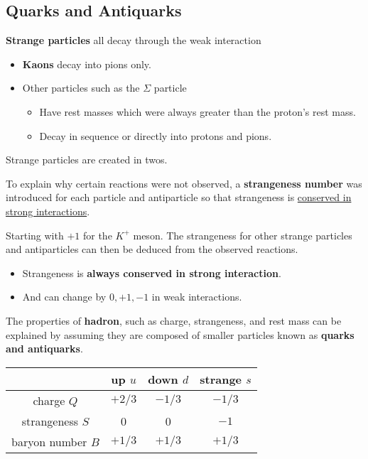 \subsection{Quarks and Antiquarks}

\textbf{Strange particles} all decay through the weak interaction
\begin{itemize}
    \item \textbf{Kaons} decay into pions only.
    \item Other particles such as the $\Sigma$ particle
        \begin{itemize}
            \item Have rest masses which were always greater than the proton's rest mass.
            \item Decay in sequence or directly into protons and pions.
        \end{itemize}
\end{itemize}
Strange particles are created in twos.

To explain why certain reactions were not observed, a \textbf{strangeness number} was introduced for each particle and antiparticle so that strangeness is \underline{conserved in strong interactions}.

Starting with $+1$ for the $K^+$ meson. The strangeness for other strange particles and antiparticles can then be deduced from the observed reactions.

\begin{itemize}
    \item Strangeness is \textbf{always conserved in strong interaction}.
    \item And can change by $0,+1,-1$ in weak interactions.
\end{itemize}

The properties of \textbf{hadron}, such as charge, strangeness, and rest mass can be explained by assuming they are composed of smaller particles known as \textbf{quarks and antiquarks}.

\begin{center}
    \begin{tabular}{|c|c|c|c|}
        \hline
        & up $u$ & down $d$ & strange $s$\\
        \hline
        charge $Q$ & $+2/3$ & $-1/3$ & $-1/3$\\
        strangeness $S$ & 0 & 0 & $-1$\\
        baryon number $B$ & $+1/3$ & $+1/3$ & $+1/3$\\
        \hline
    \end{tabular}
\end{center}

